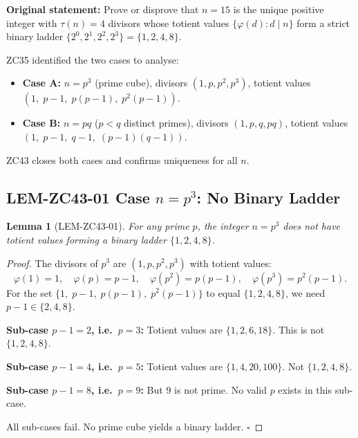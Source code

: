 \documentclass[12pt, a4paper]{article}
\newtheorem{lemma}{Lemma}[section]
\providecommand{\phitot}{\varphi}
\begin{document}

\begin{keybox}[title={GAP-ZC35-01 (ZC35): Statement Being Closed}]
\textbf{Original statement:}
Prove or disprove that $n = 15$ is the unique positive integer
with $\tau(n) = 4$ divisors whose totient values
$\{\phitot(d) : d \mid n\}$ form a strict binary ladder
$\{2^0, 2^1, 2^2, 2^3\} = \{1, 2, 4, 8\}$.

\medskip
ZC35 identified the two cases to analyse:
\begin{itemize}[leftmargin=*, noitemsep]
\item \textbf{Case A:} $n = p^3$ (prime cube), divisors
  $(1, p, p^2, p^3)$, totient values
  $(1,\; p{-}1,\; p(p{-}1),\; p^2(p{-}1))$.
\item \textbf{Case B:} $n = pq$ ($p < q$ distinct primes),
  divisors $(1, p, q, pq)$, totient values
  $(1,\; p{-}1,\; q{-}1,\; (p{-}1)(q{-}1))$.
\end{itemize}

\medskip
ZC43 closes both cases and confirms uniqueness for all $n$.
\end{keybox}

\subsection{LEM-ZC43-01 \quad Case \texorpdfstring{$n = p^3$}{n = p3}: No Binary Ladder}


\begin{lemma}[LEM-ZC43-01]
For any prime $p$, the integer $n = p^3$ does not have
totient values forming a binary ladder $\{1, 2, 4, 8\}$.
\end{lemma}

\begin{proof}
The divisors of $p^3$ are $(1, p, p^2, p^3)$ with totient values:
\[
  \phitot(1) = 1,\quad
  \phitot(p) = p-1,\quad
  \phitot(p^2) = p(p-1),\quad
  \phitot(p^3) = p^2(p-1).
\]
For the set $\{1,\; p{-}1,\; p(p{-}1),\; p^2(p{-}1)\}$ to equal
$\{1, 2, 4, 8\}$, we need $p - 1 \in \{2, 4, 8\}$.

\textbf{Sub-case $p - 1 = 2$, i.e.\ $p = 3$:}
Totient values are $\{1, 2, 6, 18\}$. This is not $\{1, 2, 4, 8\}$.

\textbf{Sub-case $p - 1 = 4$, i.e.\ $p = 5$:}
Totient values are $\{1, 4, 20, 100\}$. Not $\{1, 2, 4, 8\}$.

\textbf{Sub-case $p - 1 = 8$, i.e.\ $p = 9$:}
But $9$ is not prime. No valid $p$ exists in this sub-case.

All sub-cases fail. No prime cube yields a binary ladder.
\hfill$\square$
\end{proof}
\end{document}
